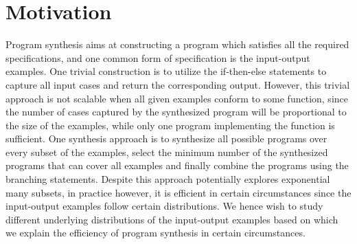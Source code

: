 \documentclass{article}
\begin{document}
\newpage
\maketitle









\section{Motivation}

Program synthesis aims at constructing a program which satisfies all the required specifications, and one common form of specification is the input-output examples. One trivial construction is to utilize the if-then-else statements to capture all input cases and return the corresponding output. However, this trivial approach is not scalable when all given examples conform to some function, since the number of cases captured by the synthesized program will be proportional to the size of the examples, while only one program implementing the function is sufficient. One synthesis approach is to synthesize all possible programs over every subset of the examples, select the minimum number of the synthesized programs that can cover all examples and finally combine the programs using the branching statements. Despite this approach potentially explores exponential many subsets, in practice however, it is efficient in certain circumstances since the input-output examples follow certain distributions. We hence wish to study different underlying distributions of the input-output examples based on which we explain the efficiency of program synthesis in certain circumstances. 
\end{document}
